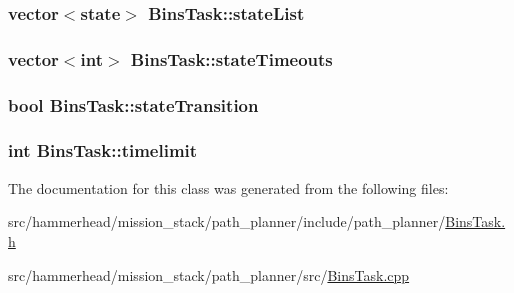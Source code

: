\subsubsection[{\texorpdfstring{state\+List}{stateList}}]{\setlength{\rightskip}{0pt plus 5cm}vector$<${\bf state}$>$ Bins\+Task\+::state\+List}\hypertarget{classBinsTask_abd44d0fdbe28dbd619f841a2d0c36be4}{}\label{classBinsTask_abd44d0fdbe28dbd619f841a2d0c36be4}
\subsubsection[{\texorpdfstring{state\+Timeouts}{stateTimeouts}}]{\setlength{\rightskip}{0pt plus 5cm}vector$<$int$>$ Bins\+Task\+::state\+Timeouts}\hypertarget{classBinsTask_a7faea4476a80bd6350abb38efe438888}{}\label{classBinsTask_a7faea4476a80bd6350abb38efe438888}
\subsubsection[{\texorpdfstring{state\+Transition}{stateTransition}}]{\setlength{\rightskip}{0pt plus 5cm}bool Bins\+Task\+::state\+Transition}\hypertarget{classBinsTask_a96feda59c1d8c1657a93b8541703c6f3}{}\label{classBinsTask_a96feda59c1d8c1657a93b8541703c6f3}
\subsubsection[{\texorpdfstring{timelimit}{timelimit}}]{\setlength{\rightskip}{0pt plus 5cm}int Bins\+Task\+::timelimit}\hypertarget{classBinsTask_ad227a105c8a9d4fbd4b11ac8292013cc}{}\label{classBinsTask_ad227a105c8a9d4fbd4b11ac8292013cc}


The documentation for this class was generated from the following files\+:\begin{DoxyCompactItemize}
\item 
src/hammerhead/mission\+\_\+stack/path\+\_\+planner/include/path\+\_\+planner/\hyperlink{BinsTask_8h}{Bins\+Task.\+h}\item 
src/hammerhead/mission\+\_\+stack/path\+\_\+planner/src/\hyperlink{BinsTask_8cpp}{Bins\+Task.\+cpp}\end{DoxyCompactItemize}

